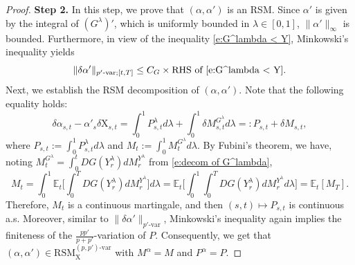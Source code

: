 \documentclass[10pt,a4paper]{amsart}
\def\E{\mathbb E}
\begin{document}
\begin{proof}
{\textbf{Step 2.}} In this step, we prove that $(\alpha,\alpha')$ is an RSM. 
Since $\alpha'$ is given by  the integral of $(G^{\lambda})'$, which is uniformly bounded in $\lambda\in[0,1]$, 
$\|\alpha'\|_{\infty}$ is bounded.
Furthermore, in view of the inequality \eqref{e:G^lambda < Y}, Minkowski's inequality yields  
\begin{equation*} \|\delta \alpha'\|_{p'\text{-}\mathrm{var};[t,T]} 
\le C_G \times \text{RHS of \eqref{e:G^lambda < Y}}.
\end{equation*}
Next, we establish the \textrm{RSM} decomposition of $(\alpha,\alpha')$. Note that the following equality holds:
\begin{equation*}
\delta \alpha_{s,t} - \alpha'_{s} \delta \mathrm X_{s,t} = \int_{0}^{1} P^{\lambda}_{s,t}  d\lambda + \int_{0}^{1} \delta M^{G^{\lambda}}_{s,t} d\lambda =: P_{s,t} + \delta M_{s,t}, 
\end{equation*}
where $P_{s,t} := \int_{0}^{1} P^{\lambda}_{s,t}  d\lambda$ and $M_{t} := \int_{0}^{1} M^{G^{\lambda}}_{t} d\lambda$. By Fubini's theorem, we have, noting $M^{G^{\lambda}}_t = \int_{0}^{t} DG(Y^{\lambda}_r)dM^{Y^{\lambda}}_r$ from \eqref{e:decom of G^lambda}, 
\begin{equation*}
M_{t} = \int_{0}^{1} \E_{t}\Big[\int_{0}^{T} DG(Y^{\lambda}_r)dM^{Y^{\lambda}}_r \Big] d\lambda = \E_{t}\Big[\int_{0}^{1}\int_{0}^{T}  DG(Y^{\lambda}_r)dM^{Y^{\lambda}}_r d\lambda \Big] = \E_{t}[M_T]. 
\end{equation*}
Therefore, $M_t$ is a continuous martingale, and then $(s,t)\mapsto P_{s,t}$ is continuous a.s. Moreover, similar to $\|\delta \alpha'\|_{p'\text{-}\mathrm{var}}$, Minkowski's inequality again implies the finiteness of the $\frac{pp'}{p+p'}$-variation of $P$. Consequently, we get that $(\alpha,\alpha')\in \mathrm{RSM}^{(p,p')\text{-}\mathrm{var}}_{\mathrm X}$ with $M^{\alpha} = M$ and $P^{\alpha} = P$.  
\end{proof}
\end{document}
